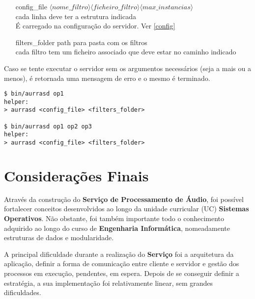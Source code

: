 \documentclass[11pt]{article}
\begin{document}
\begin{itemize}
    \item[config\_file]{$\langle nome\_filtro\rangle \langle ficheiro\_filtro\rangle \langle max\_instancias \rangle $ \\
          cada linha deve ter a estrutura indicada\\
          É carregado na configuração do servidor. Ver \ref{config}}
    \item[filters\_folder] {path para pasta com os filtros\\
          cada filtro tem um ficheiro associado que deve estar no caminho indicado}
\end{itemize}

Caso se tente executar o servidor sem os argumentos necessários (seja a mais ou a menos), é retornada uma mensagem de erro
e o mesmo é terminado.

\begin{verbatim}
$ bin/aurrasd op1
helper:
> aurrasd <config_file> <filters_folder>

$ bin/aurrasd op1 op2 op3
helper:
> aurrasd <config_file> <filters_folder>
\end{verbatim}

\section{Considerações Finais}

Através da construção do \textbf{Serviço de Processamento de Áudio}, foi possível fortalecer conceitos desenvolvidos
ao longo da unidade curricular (UC) \textbf{Sistemas Operativos}.
Não obstante, foi também importante todo o conhecimento adquirido ao longo do curso de \textbf{Engenharia Informática},
nomeadamente estruturas de dados e modularidade.

A principal dificuldade durante a realização do \textbf{Serviço} foi a arquitetura da aplicação, definir a forma de comunicação
entre cliente e servidor e gestão dos processos em execução, pendentes, em espera.
Depois de se conseguir definir a estratégia, a sua implementação foi relativamente linear, sem grandes dificuldades.
\end{document}

